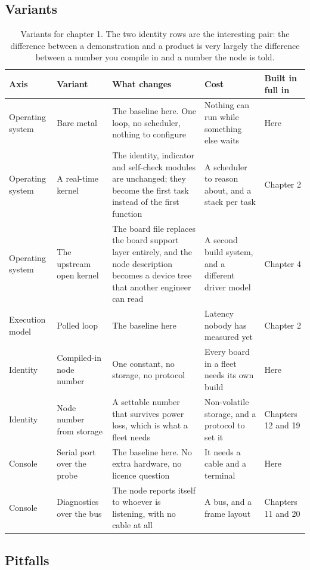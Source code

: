 \subsection*{Variants}

\begin{table}[H]\centering\small
\begin{tabular}{p{24mm}p{26mm}p{44mm}p{22mm}p{20mm}}
\toprule
Axis & Variant & What changes & Cost & Built in full in \\
\midrule
Operating system & Bare metal & The baseline here. One loop, no scheduler, nothing to configure & Nothing can run while something else waits & Here \\
Operating system & A real-time kernel & The identity, indicator and self-check modules are unchanged; they become the first task instead of the first function & A scheduler to reason about, and a stack per task & Chapter 2 \\
Operating system & The upstream open kernel & The board file replaces the board support layer entirely, and the node description becomes a device tree that another engineer can read & A second build system, and a different driver model & Chapter 4 \\
Execution model & Polled loop & The baseline here & Latency nobody has measured yet & Chapter 2 \\
Identity & Compiled-in node number & One constant, no storage, no protocol & Every board in a fleet needs its own build & Here \\
Identity & Node number from storage & A settable number that survives power loss, which is what a fleet needs & Non-volatile storage, and a protocol to set it & Chapters 12 and 19 \\
Console & Serial port over the probe & The baseline here. No extra hardware, no licence question & It needs a cable and a terminal & Here \\
Console & Diagnostics over the bus & The node reports itself to whoever is listening, with no cable at all & A bus, and a frame layout & Chapters 11 and 20 \\
\bottomrule
\end{tabular}
\caption{Variants for chapter 1. The two identity rows are the interesting pair: the difference between a demonstration and a product is very largely the difference between a number you compile in and a number the node is told.}
\end{table}

\subsection*{Pitfalls}


